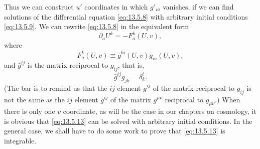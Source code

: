 Thus we can construct \(u'\) coordinates in which \(g'_{ia}\) vanishes, if
we can find solutions of the differential equation \eqref{eq:13.5.8} with
arbitrary initial conditions \eqref{eq:13.5.9}. We can rewrite
\eqref{eq:13.5.8} in the equivalent form
\begin{equation}
  \partial_a U^k=-F_a^k(U,v),
  \tag{13.5.13}\label{eq:13.5.13}
\end{equation}
where
\begin{equation}
  F_a^k(U,v)
  \equiv
  \bar g^{ki}(U,v)g_{ia}(U,v),
  \tag{13.5.14}\label{eq:13.5.14}
\end{equation}
and \(\bar g^{ij}\) is the matrix reciprocal to \(g_{ij}\), that is,
\begin{equation}
  \bar g^{ij}g_{jk}=\delta^i_k.
  \tag{13.5.15}\label{eq:13.5.15}
\end{equation}
(The bar is to remind us that the \(ij\) element \(\bar g^{ij}\) of the
matrix reciprocal to \(g_{ij}\) is not the same as the \(ij\) element
\(g^{ij}\) of the matrix \(g^{\mu\nu}\) reciprocal to \(g_{\mu\nu}\).)
When there is only one \(v\) coordinate, as will be the case in our chapters
on cosmology, it is obvious that \eqref{eq:13.5.13} can be solved with
arbitrary initial conditions. In the general case, we shall have to do some
work to prove that \eqref{eq:13.5.13} is integrable.

